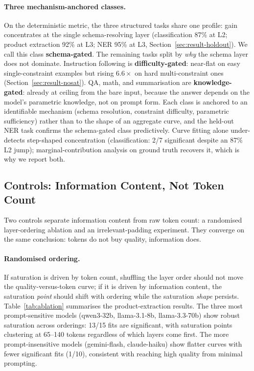 \paragraph{Three mechanism-anchored classes.}
On the deterministic metric, the three structured tasks share one profile: gain
concentrates at the single schema-resolving layer (classification 87\% at L2;
product extraction 92\% at L3; NER 95\% at L3,
Section~\ref{sec:result-holdout}). We call this class \textbf{schema-gated}. The
remaining tasks split by \emph{why} the schema layer does not dominate.
Instruction following is \textbf{difficulty-gated}: near-flat on easy
single-constraint examples but rising $6.6\times$ on hard multi-constraint ones
(Section~\ref{sec:result-nosat}). QA, math, and summarisation are
\textbf{knowledge-gated}: already at ceiling from the bare input, because the
answer depends on the model's parametric knowledge, not on prompt form. Each
class is anchored to an identifiable mechanism (schema resolution, constraint
difficulty, parametric sufficiency) rather than to the shape of an aggregate
curve, and the held-out NER task confirms the schema-gated class predictively.
Curve fitting alone under-detects step-shaped concentration (classification:
2/7 significant despite an 87\% L2 jump); marginal-contribution analysis on
ground truth recovers it, which is why we report both.

\subsection{Controls: Information Content, Not Token Count}
\label{sec:result-controls}

Two controls separate information content from raw token count: a randomised
layer-ordering ablation and an irrelevant-padding experiment. They converge on
the same conclusion: tokens do not buy quality, information does.

\paragraph{Randomised ordering.}
If saturation is driven by token count, shuffling the layer order should not
move the quality-versus-token curve; if it is driven by information content, the
saturation \emph{point} should shift with ordering while the saturation
\emph{shape} persists. Table~\ref{tab:ablation} summarises the product-extraction
results. The three most prompt-sensitive models (qwen3-32b, llama-3.1-8b,
llama-3.3-70b) show robust saturation across orderings: 13/15 fits are
significant, with saturation points clustering at 65--140 tokens regardless of
which layers come first. The more prompt-insensitive models (gemini-flash,
claude-haiku) show flatter curves with fewer significant fits (1/10), consistent
with reaching high quality from minimal prompting.

